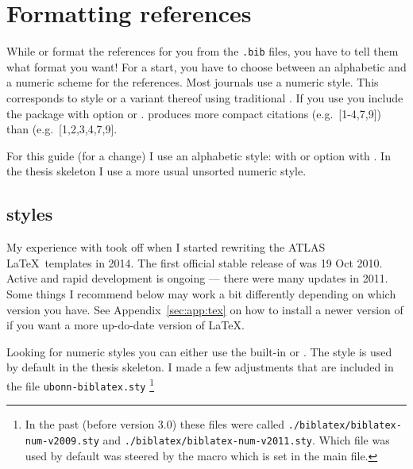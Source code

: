 \section{Formatting references}
\label{sec:ref:format}

While \BibTeX{} or  format the references for you
from the \texttt{.bib} files, you have to tell them what format you
want!  For a start, you have to choose between an alphabetic and a
numeric scheme for the references. Most journals use a numeric
style. This corresponds to style  or a variant thereof
using traditional \BibTeX.  If you use  you include the
package with option  or
.  produces more compact
citations (e.g.\ [1-4,7,9]) than  (e.g.\
[1,2,3,4,7,9].

For this guide (for a change) I use an alphabetic style:
 with \BibTeX{} or option  with
\Package{biblatex}. In the thesis skeleton I use a more usual unsorted
numeric style.


\subsection{\Package{biblatex} styles}
\label{sec:ref:bbx}

My experience with  took off 
when I started rewriting the ATLAS \LaTeX\ templates in 2014.
The first official stable release of  was 19 Oct 2010.
Active and rapid development is ongoing --- there were many updates in 2011.
Some things I recommend below may work a bit differently depending on which version
you have. See Appendix~\ref{sec:app:tex} on how to install a newer
version of \TeXLive if you want a more up-do-date version of \LaTeX.

Looking for numeric styles you can either use the built-in
 or .  The 
style is used by default in the thesis skeleton. I made a few
adjustments that are included in the file
\texttt{ubonn-biblatex.sty}%
\footnote{In the past (before version 3.0) these files were called
  \texttt{./biblatex/biblatex-num-v2009.sty} and
  \texttt{./biblatex/biblatex-num-v2011.sty}. Which file was used
  by default was steered by the \Macro{texlive} macro which is set in the
  main file.}

